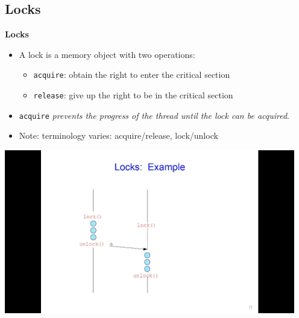 \documentclass[11pt,a4paper]{article}
\begin{document}
\subsection{Locks}

\textbf{Locks}
\begin{itemize}
    \item A lock is a memory object with two operations:
        \begin{itemize}
            \item \texttt{acquire}: obtain the right to enter the critical section
            \item \texttt{release}: give up the right to be in the critical section
        \end{itemize}
    \item \texttt{acquire} \emph{prevents the progress of the thread until the lock
        can be acquired}.
    \item Note: terminology varies: acquire/release, lock/unlock
\end{itemize}

\includegraphics[height=270]{locks.jpg}
\end{document}
